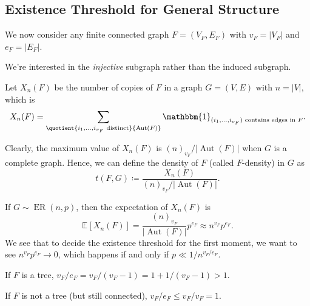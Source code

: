 \subsection{Existence Threshold for General Structure}
We now consider any finite connected graph \(F = (V_F, E_F)\) with \(v_F = \lvert V_F \rvert \) and \(e_F = \lvert E_F \rvert\).

\begin{note}
	We're interested in the \emph{injective} subgraph rather than the induced subgraph.
\end{note}

Let \(X_n(F)\) be the number of copies of \(F\) in a graph \(G = (V, E)\) with \(n = \lvert V \rvert \), which is
\[
	X_n(F)
	= \sum_{\quotient{i_1, \dots , i_{v_F} \text{ distinct}}{\operatorname{Aut}(F)}} \mathbbm{1}_{(i_1, \dots , i_{v_F})\text{ contains edges in } F}.
\]
\begin{remark}[\(F\)-density]
	Clearly, the maximum value of \(X_n(F)\) is \((n)_{v_F} / \lvert \operatorname{Aut}(F)  \rvert \) when \(G\) is a complete graph. Hence, we can define the density of \(F\) (called \(F\)-density) in \(G\) as
	\[
		t(F, G)
		\coloneqq \frac{X_n(F)}{(n)_{v_F} / \lvert \operatorname{Aut}(F)  \rvert }.
	\]
\end{remark}

If \(G \sim \operatorname{ER}(n, p) \), then the expectation of \(X_n(F)\) is
\[
	\mathbb{E}_{}[X_n(F)]
	= \frac{(n)_{v_F}}{\lvert \operatorname{Aut}(F)  \rvert } p^{e_F}
	\approx n^{v_F} p^{e_F}.
\]
We see that to decide the existence threshold for the first moment, we want to see \(n^{v_F} p^{e_F} \to 0\), which happens if and only if \(p \ll 1 / n^{v_F / e_F}\).

\begin{eg}
	If \(F\) is a tree, \(v_F / e_F = v_F / (v_F - 1) = 1 + 1 / (v_F - 1) > 1\).
\end{eg}

\begin{eg}
	If \(F\) is not a tree (but still connected), \(v_F / e_F \leq v_F / v_F = 1\).
\end{eg}

